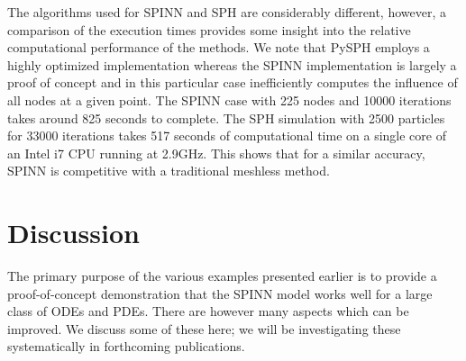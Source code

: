 \documentclass[12pt]{article}
\newcommand{\rb}[1]{#1}
\begin{document}
\rb{The algorithms used for SPINN and SPH are considerably different, however, a comparison of the execution times provides some insight into the relative computational performance of the methods. We note that PySPH employs a highly optimized implementation whereas the SPINN implementation is largely a proof of concept and in this particular case inefficiently computes the influence of all nodes at a given point.  The SPINN case with 225 nodes and 10000 iterations takes around 825 seconds to complete.  The SPH simulation with 2500 particles for 33000 iterations takes 517 seconds of computational time on a single core of an Intel i7 CPU running at 2.9GHz. This shows that for a similar accuracy, SPINN is competitive with a traditional meshless method.
}



\section{Discussion}

The primary purpose of the various examples presented earlier is to provide a proof-of-concept demonstration that the SPINN model works well for a large class of ODEs and PDEs. There are however many aspects which can be improved. We discuss some of these here; we will be investigating these systematically in forthcoming publications.
\end{document}
